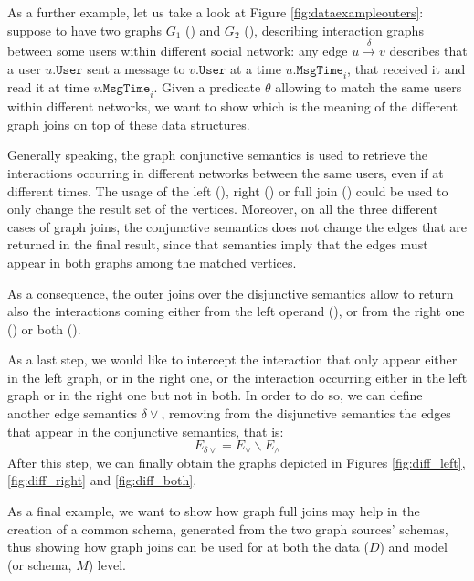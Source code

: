 \begin{example}
As a further example, let us take a look at Figure \ref{fig:dataexampleouters}: suppose to have two graphs $G_1$ () and $G_2$ (), describing interaction graphs between some users within different social network: any edge $u\xrightarrow{\delta}v$ describes that a user $u.\texttt{User}$ sent a message to $v.\texttt{User}$ at a time $u.\texttt{MsgTime}_i$, that received it and read it at time $v.\texttt{MsgTime}_i$. Given a predicate $\theta$ allowing to match the same users within different networks, we want to show which is the meaning of the different graph joins on top of these data structures.

Generally speaking, the graph conjunctive semantics is used to retrieve the interactions occurring in different networks between the same users, even if at different times. The usage of the left (), right () or full join () could be used to only change the result set of the vertices. Moreover, on all the three different cases of graph joins, the conjunctive semantics does not change the edges that are returned in the final result, since that semantics imply that the edges must appear in both graphs among the matched vertices.

As a consequence, the outer joins over the disjunctive semantics allow to return also the interactions coming either from the left operand (), or from the right one () or both ().

As a last step, we would like to intercept the interaction that only appear either in the left graph, or in the right one, or the interaction occurring either in the left graph or in the right one but not in both. In order to do so, we can define another edge semantics $\delta\vee$, removing from the disjunctive semantics the edges that appear in the conjunctive semantics, that is:
\[E_{\delta\vee}=E_\vee\backslash E_\wedge\]
After this step, we can finally obtain the graphs depicted in Figures \ref{fig:diff_left}, \ref{fig:diff_right} and \ref{fig:diff_both}. 
\end{example}

As a final example, we want to show how graph full joins may help in the creation of a common schema, generated from the two graph sources' schemas, thus showing how graph joins can be used for at both the data ($D$) and model (or schema, $M$) level. 


